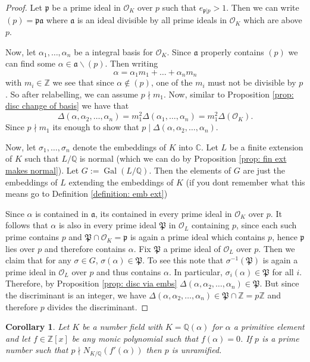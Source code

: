 \documentclass[11pt,a4paper]{report}
\theoremstyle{plain}
\newtheorem{corollary}[subsection]{Corollary}
\theoremstyle{definition}
\theoremstyle{definition}
\newcommand{\ZZ}{\mathbb{Z}}
\def\CC{\mathbb{C}}
\def\QQ{\mathbb{Q}}
\def \gothP{\mathfrak{P}}
\def\gothp{\mathfrak{p}}
\def \a{\alpha}
\def \s {\sigma}
\def \OO {\mathcal{O}}
\def \s {\sigma}
\def\gotha{\mathfrak{a}}
\DeclareMathOperator{\Gal}{Gal}
\begin{document}
	\begin{proof}
		Let $\gothp$ be a prime ideal in $\OO_K$ over $p$ such that $e_{\gothp|p}>1$. Then we can write $(p)=\gothp \gotha$ where $\gotha$ is an ideal divisible by all prime ideals in $\OO_K$ which are above $p$. 
		
		Now, let $\a_1,\dots,\a_n$ be  a integral basis for $\OO_K$. Since $\gotha$ properly contains $(p)$ we can find some $\a \in \gotha \backslash (p)$. Then writing \[\a=\a_1m_1+\dots+\a_nm_n\] with $m_i \in \ZZ$ we see that since $\a \not \in (p)$, one of the $m_i$ must not be divisible by $p$. So after relabelling, we can assume $p \nmid m_1$. Now, similar to Proposition \ref{prop: disc change of basis} we have that \[\Delta(\a,\a_2,\dots,\a_n)=m_1^2 \Delta(\a_1,\dots,\a_n)=m_1^2\Delta(\OO_K).\] Since $p \nmid m_1$ its enough to show that $p \mid \Delta(\a,\a_2,\dots,\a_n)$.
		
		Now, let $\s_1,\dots,\s_n$ denote the embeddings of $K$ into $\CC$. Let $L$ be a finite extension of $K$ such that $L/\QQ$ is normal (which we can do by Proposition \ref{prop: fin ext makes normal}). Let $G:=\Gal(L/\QQ)$. Then the elements of $G$ are just the embeddings of $L$ extending the embeddings of $K$ (if you dont remember what this means go to Definition \ref{definition: emb ext})
		
		Since $\a$ is contained in $\gotha$, its contained in every prime ideal in $\OO_K$ over $p$. It follows that $\a$ is also in every prime ideal $\gothP$ in $\OO_L$ containing $p$, since each such prime contains $p$ and $\gothP \cap \OO_K=\gothp$ is again a prime ideal which contains $p$, hence $\gothp$ lies over $p$ and therefore contains $\a$. Fix $\gothP$ a prime ideal of $\OO_L$ over $p$. Then we claim that for any $\s \in G$, $\s(\a) \in \gothP$. To see this note that $\s^{-1}(\gothP)$ is again a prime ideal in $\OO_L$ over $p$ and thus contains $\a$. In particular, $\s_i(\a) \in \gothP$ for all $i$. Therefore, by Proposition \ref{prop: disc via embs} $\Delta(\a,\a_2,\dots,\a_n) \in \gothP$. But since the discriminant is an integer, we have $\Delta(\a,\a_2,\dots,\a_n) \in \gothP \cap \ZZ=p\ZZ$ and therefore $p$ divides the discriminant.
		
	\end{proof}
	
	\begin{corollary}\label{cor: p unram if norm of blah}
		Let $K$ be a number field with $K=\QQ(\a)$ for $\a$ a primitive element and let $f \in \ZZ[x]$ be any monic polynomial such that $f(\a)=0$. If $p$ is a prime number such that $p \nmid N_{K/\QQ}(f'(\a))$ then $p$ is unramified.
	\end{corollary}
	
\end{document}
